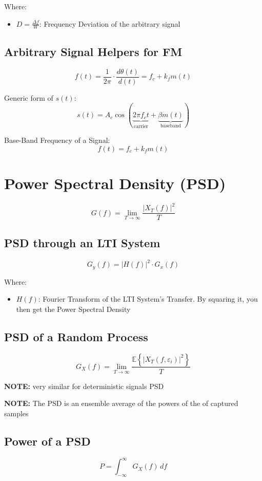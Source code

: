 \documentclass[10pt]{article}
\begin{document}
\noindent Where:
\begin{itemize}
	\item $D = \frac{\Delta f}{W} $: Frequency Deviation of the arbitrary signal
\end{itemize}

\subsection{Arbitrary Signal Helpers for FM}
\[
	f(t) = \frac{1}{2\pi} \cdot \frac{d\theta(t)}{d(t)} = f_c + k_f m(t)
\]

Generic form of $s(t)$:
\[
	s(t) = A_c\cos(\underbrace{2 \pi f_c t}_{\text{carrier}} + \underbrace{\beta m(t)}_{\text{baseband}})
\]

Base-Band Frequency of a Signal:
\[
	f(t) = f_c + k_f m(t)
\]

\section{Power Spectral Density (PSD)}
\[
	G(f) = \lim_{T \to \infty} \frac{|X_T(f)|^2}{T}
\]

\subsection{PSD through an LTI System}
\[
    G_y(f) = \left|H(f)\right|^2 \cdot G_x(f)
\]

\noindent Where:
\begin{itemize}
    \item $H(f)$: Fourier Transform of the LTI System's Transfer. By squaring it, you then get the Power Spectral Density
\end{itemize}

\subsection{PSD of a Random Process}
\[
G_X(f) = \lim_{T \to \infty} \frac{\mathbb{E} \left\{ |X_T(f, \varepsilon_i)|^2 \right\}}{T}
\]

\noindent\textbf{NOTE:} very similar for deterministic signals PSD

\noindent\textbf{NOTE:} The PSD is an ensemble average of the powers of the of captured samples

\subsection{Power of a PSD}
\[
    P = \int_{-\infty}^{\infty} G_X(f) \, d\!f 
\]
\end{document}
